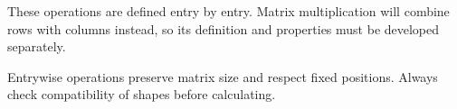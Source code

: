 \begin{remarkbox}
These operations are defined entry by entry. Matrix multiplication will combine
rows with columns instead, so its definition and properties must be developed
separately.
\end{remarkbox}

\begin{summarybox}
Entrywise operations preserve matrix size and respect fixed positions. Always
check compatibility of shapes before calculating.
\end{summarybox}
